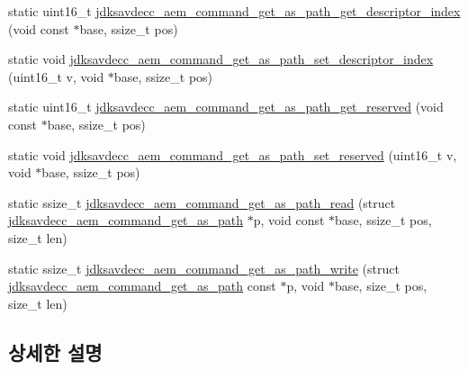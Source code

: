 \begin{DoxyCompactItemize}
\item 
static uint16\+\_\+t \hyperlink{group__command__get__as__path_gad39e7c06fbaf1d25e4468b9c3df04110}{jdksavdecc\+\_\+aem\+\_\+command\+\_\+get\+\_\+as\+\_\+path\+\_\+get\+\_\+descriptor\+\_\+index} (void const $\ast$base, ssize\+\_\+t pos)
\item 
static void \hyperlink{group__command__get__as__path_ga18df54cdd2907e882818275e04699f66}{jdksavdecc\+\_\+aem\+\_\+command\+\_\+get\+\_\+as\+\_\+path\+\_\+set\+\_\+descriptor\+\_\+index} (uint16\+\_\+t v, void $\ast$base, ssize\+\_\+t pos)
\item 
static uint16\+\_\+t \hyperlink{group__command__get__as__path_ga475cf7c526cf6aac7b711dd1ec10dc36}{jdksavdecc\+\_\+aem\+\_\+command\+\_\+get\+\_\+as\+\_\+path\+\_\+get\+\_\+reserved} (void const $\ast$base, ssize\+\_\+t pos)
\item 
static void \hyperlink{group__command__get__as__path_ga13cea446e3aceee3101e3e07c67b2f29}{jdksavdecc\+\_\+aem\+\_\+command\+\_\+get\+\_\+as\+\_\+path\+\_\+set\+\_\+reserved} (uint16\+\_\+t v, void $\ast$base, ssize\+\_\+t pos)
\item 
static ssize\+\_\+t \hyperlink{group__command__get__as__path_gadafdb58af76e8c85af8737f0f55ee431}{jdksavdecc\+\_\+aem\+\_\+command\+\_\+get\+\_\+as\+\_\+path\+\_\+read} (struct \hyperlink{structjdksavdecc__aem__command__get__as__path}{jdksavdecc\+\_\+aem\+\_\+command\+\_\+get\+\_\+as\+\_\+path} $\ast$p, void const $\ast$base, ssize\+\_\+t pos, size\+\_\+t len)
\item 
static ssize\+\_\+t \hyperlink{group__command__get__as__path_ga02124c62f45a6f1e49ab5e5325beae38}{jdksavdecc\+\_\+aem\+\_\+command\+\_\+get\+\_\+as\+\_\+path\+\_\+write} (struct \hyperlink{structjdksavdecc__aem__command__get__as__path}{jdksavdecc\+\_\+aem\+\_\+command\+\_\+get\+\_\+as\+\_\+path} const $\ast$p, void $\ast$base, size\+\_\+t pos, size\+\_\+t len)
\end{DoxyCompactItemize}


\subsection{상세한 설명}


